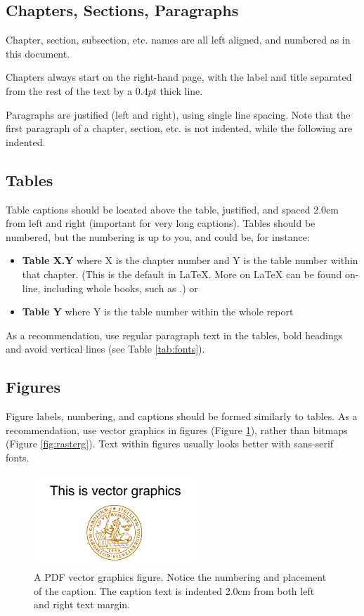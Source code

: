 \documentclass[nofilelist]{cslthse-msc}
\begin{document}
\begin{appendices}
\subsection{Chapters, Sections, Paragraphs}
Chapter, section, subsection, etc. names are all left aligned, and numbered as in this document. 

Chapters always start on the right-hand page, with the label and title separated from the rest of the text by a $0.4 pt$ thick line.

Paragraphs are justified (left and right), using single line spacing. Note that the first paragraph of a chapter, section, etc. is not indented, while the following are indented.

\subsection{Tables}
Table captions should be located above the table, justified, and spaced 2.0cm from left and right (important for very long captions). Tables should be numbered, but the numbering is up to you, and could be, for instance:
\begin{itemize}
\item \textbf{Table X.Y} where X is the chapter number and Y is the table number within that chapter. (This is the default in \LaTeX. More on {\LaTeX} can be found on-line, including whole books, such as \cite{goossens93}.) or
\item \textbf{Table Y} where Y is the table number within the whole report
\end{itemize}
As a recommendation, use regular paragraph text in the tables, bold headings and avoid vertical lines (see Table \ref{tab:fonts}). 

\subsection{Figures}
Figure labels, numbering, and captions should be formed similarly to tables. As a recommendation, use vector graphics in figures (Figure \ref{fig:vectorg}), rather than bitmaps (Figure \ref{fig:rasterg}). Text within figures usually looks better with sans-serif fonts.
\begin{figure}[!hbt]
\centering
\includegraphics[scale=2.5]{examplepic1.pdf} 
\caption{A PDF vector graphics figure. Notice the numbering and placement of the caption. The caption text is indented 2.0cm from both left and right text margin.}\label{fig:vectorg}
\end{figure}


\end{appendices}
\end{document}
